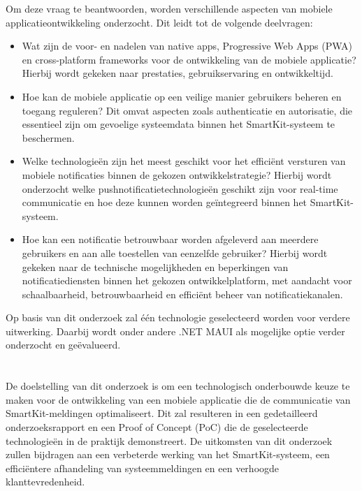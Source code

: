 \noindent Om deze vraag te beantwoorden, worden verschillende aspecten van mobiele applicatieontwikkeling onderzocht. Dit leidt tot de volgende deelvragen:

\begin{itemize}
    \item Wat zijn de voor- en nadelen van native apps, Progressive Web Apps (PWA) en cross-platform frameworks voor de ontwikkeling van de mobiele applicatie? Hierbij wordt gekeken naar prestaties, gebruikservaring en ontwikkeltijd.
    
    \item Hoe kan de mobiele applicatie op een veilige manier gebruikers beheren en toegang reguleren? Dit omvat aspecten zoals authenticatie en autorisatie, die essentieel zijn om gevoelige systeemdata binnen het SmartKit-systeem te beschermen.
    
    \item Welke technologieën zijn het meest geschikt voor het efficiënt versturen van mobiele notificaties binnen de gekozen ontwikkelstrategie? Hierbij wordt onderzocht welke pushnotificatietechnologieën geschikt zijn voor real-time communicatie en hoe deze kunnen worden geïntegreerd binnen het SmartKit-systeem.
    
    \item Hoe kan een notificatie betrouwbaar worden afgeleverd aan meerdere gebruikers en aan alle toestellen van eenzelfde gebruiker? Hierbij wordt gekeken naar de technische mogelijkheden en beperkingen van notificatiediensten binnen het gekozen ontwikkelplatform, met aandacht voor schaalbaarheid, betrouwbaarheid en efficiënt beheer van notificatiekanalen.
\end{itemize}

\noindent Op basis van dit onderzoek zal één technologie geselecteerd worden voor verdere uitwerking. Daarbij wordt onder andere .NET MAUI als mogelijke optie verder onderzocht en geëvalueerd.


\section{}%
\label{sec:onderzoeksdoelstelling}

\noindent De doelstelling van dit onderzoek is om een technologisch onderbouwde keuze te maken voor de ontwikkeling van een mobiele applicatie die de communicatie van SmartKit-meldingen optimaliseert. Dit zal resulteren in een gedetailleerd onderzoeksrapport en een Proof of Concept (PoC) die de geselecteerde technologieën in de praktijk demonstreert. De uitkomsten van dit onderzoek zullen bijdragen aan een verbeterde werking van het SmartKit-systeem, een efficiëntere afhandeling van systeemmeldingen en een verhoogde klanttevredenheid. \\

